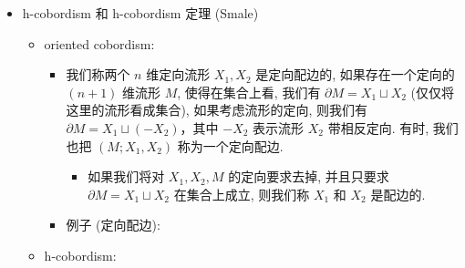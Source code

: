\documentclass[
]{ctexart}
\providecommand{\tightlist}{%
  \setlength{\itemsep}{0pt}\setlength{\parskip}{0pt}}
\begin{document}
\begin{itemize}
\begin{itemize}
\begin{itemize}
      \begin{itemize}
      \tightlist
      \item
        Morse 函数: 给定一个光滑流形 \(M\) 上的光滑函数
        \(f: M \to \mathbb{R}\)，若其所有临界点(导数为零的点)都非退化
        (二阶导数矩阵, 即Hessian 矩阵
        \(H_{ij}(p) = \frac{\partial^2 f}{\partial x_i \partial x_j}(p)\)
        的行列式不为零) ，则称 \(f\) 为一个 Morse 函数. 我们可以根据
        Hessian 矩阵的 signature(负惯性指数) 来定义临界点的指标。
      \item
        光滑流形 \(M^n\) 上的任意 Morse 函数给出 \(M^n\) 上的一个 handle
        分解. 且指标为 \(k\) 的临界点对应一个 \(k\) -handle 的粘接。
      \item
        光滑流形 \(M^n\) 上总存在 Morse 函数 (事实上, Morse 函数在
        \(C^\infty\left(M\right)\) 中是稠密的,
        \(C^\infty\left(M\right)\) 定义为 \(M\)
        上所有光滑函数构成的空间)
      \item
        结合以上，handle 分解总存在。
      \end{itemize}
    \end{itemize}
  \item
    例子: \(T^2\) 的 handle 分解.
  \end{itemize}
\item
  h-cobordism 和 h-cobordism 定理 (Smale)

  \begin{itemize}
  \tightlist
  \item
    oriented cobordism:

    \begin{itemize}
    \tightlist
    \item
      我们称两个 \(n\) 维定向流形 \(X_1,X_2\) 是定向配边的,
      如果存在一个定向的 \((n+1)\) 维流形 \(M\), 使得在集合上看, 我们有
      \(\partial M=X_1\sqcup X_2\) (仅仅将这里的流形看成集合),
      如果考虑流形的定向, 则我们有
      \(\partial M = X_1 \sqcup (-X_2)\)，其中 \(-X_2\) 表示流形 \(X_2\)
      带相反定向. 有时, 我们也把 \(\left(M;X_1,X_2\right)\)
      称为一个定向配边.

      \begin{itemize}
      \tightlist
      \item
        如果我们将对 \(X_1,X_2,M\) 的定向要求去掉, 并且只要求
        \(\partial M=X_1\sqcup X_2\) 在集合上成立, 则我们称 \(X_1\) 和
        \(X_2\) 是配边的.
      \end{itemize}
    \item
      例子 (定向配边):
    \end{itemize}
  \item
    h-cobordism:


\end{itemize}
\end{itemize}
\end{document}
